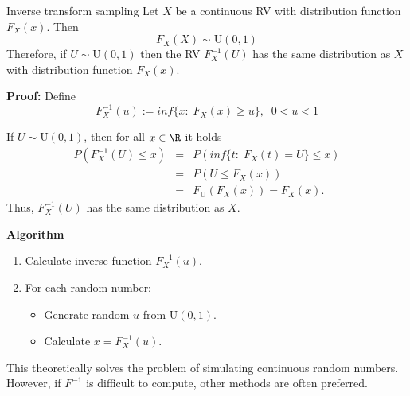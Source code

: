 \documentclass[11pt,compress,t,notes=noshow, xcolor=table]{beamer}
\begin{document}

\begin{vbframe}{Inverse transform sampling}
Let $X$ be a continuous RV with distribution function $F_X(x)$. Then
$$
F_X(X) \sim \text{U}(0, 1)
$$
Therefore, if $U \sim \text{U}(0, 1)$ then the RV $F_X^{-1}(U)$ has the same distribution as $X$ with distribution function $F_X(x)$.

\lz
\begin{footnotesize}
\textbf{Proof:}
Define
$$
F_X^{-1}(u):= inf\{x: \; F_X(x) \geq u\}, \; \; 0<u<1
$$

\lz

If $U \sim \text{U}(0, 1)$, then for all $x \in \R$ it holds 
\begin{eqnarray*}
P(F_X^{-1}(U) \leq x) &=& P(inf\{t: \; F_X(t)=U\} \leq x) \\
&=&P(U \leq F_X(x)) \\
&=&F_\text{U}(F_X(x))=F_X(x).
\end{eqnarray*}
\lz
Thus, $F_X^{-1}(U)$ has the same distribution as $X$.
\end{footnotesize}
\framebreak

\textbf{Algorithm}

\begin{enumerate}
\item Calculate inverse function $F_X^{-1}(u)$.
\item For each random number:
\begin{itemize}
\item Generate random $u$ from $\text{U}(0,1)$.
\item Calculate $x=F_X^{-1}(u)$.
\end{itemize}
\end{enumerate}

\lz

This theoretically solves the problem of simulating continuous random numbers. However, if $F^{-1}$ is difficult to compute, other methods are often preferred.
\end{vbframe}
\end{document}

